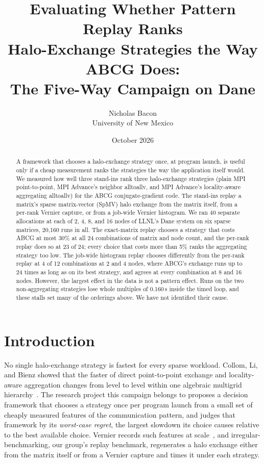\documentclass[11pt]{article}
\title{Evaluating Whether Pattern Replay Ranks\\Halo-Exchange Strategies the Way ABCG Does:\\The Five-Way Campaign on Dane}
\author{Nicholas Bacon\\University of New Mexico}
\date{October 2026}
\begin{document}
\maketitle

\begin{abstract}
A framework that chooses a halo-exchange strategy once, at program launch, is useful only
if a cheap measurement ranks the strategies the way the application itself would. We
measured how well three stand-ins rank three halo-exchange strategies (plain MPI
point-to-point, MPI Advance's neighbor alltoallv, and MPI Advance's locality-aware
aggregating alltoallv) for the ABCG conjugate-gradient code. The stand-ins replay a
matrix's sparse matrix-vector (SpMV) halo exchange from the matrix itself, from a
per-rank Vernier capture, or from a job-wide Vernier histogram. We ran 40 separate
allocations at each of 2, 4, 8, and 16 nodes of LLNL's Dane system on six sparse matrices,
20,160 runs in all. The exact-matrix replay chooses a strategy that costs ABCG at most
30\% at all 24 combinations of matrix and node count, and the per-rank replay does so at
23 of 24; every choice that costs more than 5\% ranks the aggregating strategy too low. The
job-wide histogram replay chooses differently from the per-rank replay at 4 of 12
combinations at 2 and 4 nodes, where ABCG's exchange runs up to 24 times as long as on its
best strategy, and agrees at every combination at 8 and 16 nodes. However, the largest
effect in the data is not a pattern effect. Runs on the two non-aggregating strategies
lose whole multiples of 0.160\,s inside the timed loop, and these stalls set many of the
orderings above. We have not identified their cause.
\end{abstract}

\section{Introduction}
\label{sec:intro}

No single halo-exchange strategy is fastest for every sparse workload. Collom, Li, and
Bienz showed that the faster of direct point-to-point exchange and locality-aware
aggregation changes from level to level within one algebraic multigrid
hierarchy~\cite{collom2023}. The research project this campaign belongs to proposes a
decision framework that chooses a strategy once per program launch from a small set of
cheaply measured features of the communication pattern, and judges that framework by its
\emph{worst-case regret}, the largest slowdown its choice causes relative to the best
available choice. Vernier records such features at scale~\cite{vernier2025}, and
irregular-benchmarking, our group's replay benchmark, regenerates a halo exchange either
from the matrix itself or from a Vernier capture and times it under each strategy.
\end{document}
